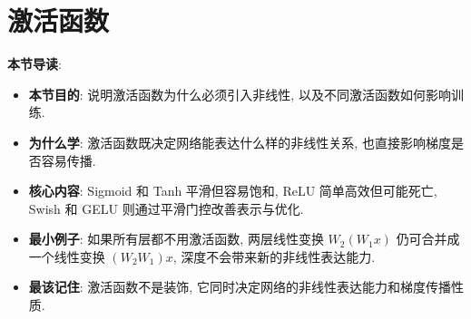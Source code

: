 \documentclass{../nndlcourse}
\begin{document}
\section{激活函数}

\textbf{本节导读}:
\begin{itemize}
    \item \textbf{本节目的}: 说明激活函数为什么必须引入非线性, 以及不同激活函数如何影响训练.
    \item \textbf{为什么学}: 激活函数既决定网络能表达什么样的非线性关系, 也直接影响梯度是否容易传播.
    \item \textbf{核心内容}: Sigmoid 和 Tanh 平滑但容易饱和, ReLU 简单高效但可能死亡, Swish 和 GELU 则通过平滑门控改善表示与优化.
    \item \textbf{最小例子}: 如果所有层都不用激活函数, 两层线性变换 $W_2(W_1x)$ 仍可合并成一个线性变换 $(W_2W_1)x$, 深度不会带来新的非线性表达能力.
    \item \textbf{最该记住}: 激活函数不是装饰, 它同时决定网络的非线性表达能力和梯度传播性质.
\end{itemize}
\end{document}
